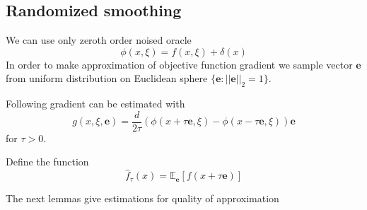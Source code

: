\documentclass{article}
\theoremstyle{definition}
\theoremstyle{remark}
\def\EE{\mathbb{E}}
\begin{document}
\subsection{Randomized smoothing}
We can use only zeroth order noised oracle
$$\phi(x,\xi) = f(x, \xi) +\delta(x) $$
In order to make approximation of objective function gradient we  sample vector $\mathbf{e}$ from uniform distribution on Euclidean sphere $\{\mathbf{e}: ||\mathbf{e}||_2 = 1\}$. 

Following \cite{shamir2017optimal} gradient can be estimated with
\begin{equation}\label{g}
g(x, \xi, \mathbf{e}) = \frac{d}{2\tau}(\phi(x + \tau \mathbf{e}, \xi) - \phi(x - \tau \mathbf{e}, \xi)) \mathbf{e}
\end{equation}
for $\tau > 0$.

Define the function
\begin{equation}\label{hat_f}
    \hat{f}_\tau (x) = \EE_{\mathbf{e}} [f(x + \tau\mathbf{e})]
\end{equation}


The next lemmas give estimations for quality of approximation
\end{document}
